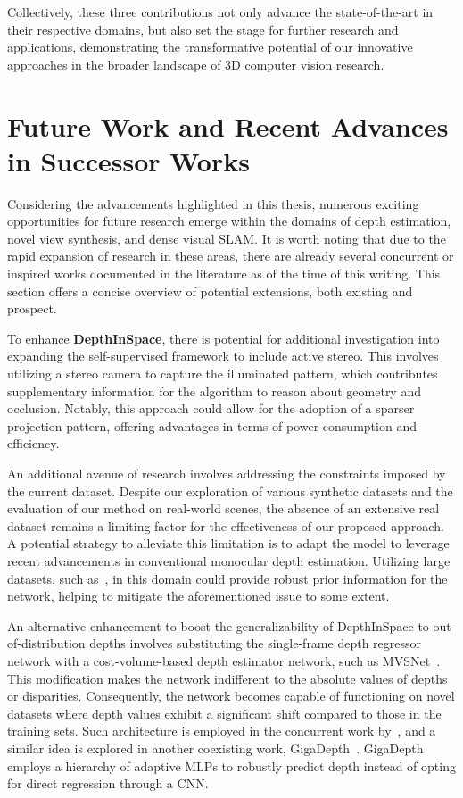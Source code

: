  Collectively, these three contributions not only advance the state-of-the-art in their respective domains, but also set the stage for further research and applications, demonstrating the transformative potential of our innovative approaches in the broader landscape of 3D computer vision research.

\section{Future Work and Recent Advances in Successor Works}

Considering the advancements highlighted in this thesis, numerous exciting opportunities for future research emerge within the domains of depth estimation, novel view synthesis, and dense visual SLAM. It is worth noting that due to the rapid expansion of research in these areas, there are already several concurrent or inspired works documented in the literature as of the time of this writing. This section offers a concise overview of potential extensions, both existing and prospect.


To enhance \textbf{DepthInSpace}, there is potential for additional investigation into expanding the self-supervised framework to include active stereo. This involves utilizing a stereo camera to capture the illuminated pattern, which contributes supplementary information for the algorithm to reason about geometry and occlusion. Notably, this approach could allow for the adoption of a sparser projection pattern, offering advantages in terms of power consumption and efficiency.

An additional avenue of research involves addressing the constraints imposed by the current dataset. Despite our exploration of various synthetic datasets and the evaluation of our method on real-world scenes, the absence of an extensive real dataset remains a limiting factor for the effectiveness of our proposed approach. A potential strategy to alleviate this limitation is to adapt the model to leverage recent advancements in conventional monocular depth estimation. Utilizing large datasets, such as~\cite{ranftl2020towards}, in this domain could provide robust prior information for the network, helping to mitigate the aforementioned issue to some extent.

An alternative enhancement to boost the generalizability of DepthInSpace to out-of-distribution depths involves substituting the single-frame depth regressor network with a cost-volume-based depth estimator network, such as MVSNet~\citep{yao2018mvsnet}. This modification makes the network indifferent to the absolute values of depths or disparities. Consequently, the network becomes capable of functioning on novel datasets where depth values exhibit a significant shift compared to those in the training sets. Such architecture is employed in the concurrent work by~\cite{li2023self}, and a similar idea is explored in another coexisting work, GigaDepth~\citep{schreiberhuber2022gigadepth}. GigaDepth employs a hierarchy of adaptive MLPs to robustly predict depth instead of opting for direct regression through a CNN.

